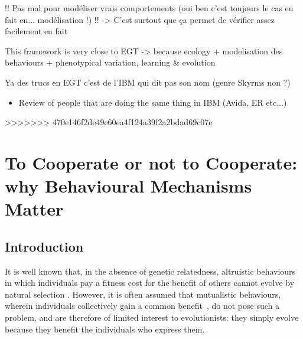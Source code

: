     !! Pas mal pour modéliser vrais comportements (oui ben c'est toujours le cas en fait en... modélisation !) !!
        -> C'est surtout que ça permet de vérifier assez facilement en fait

    This framework is very close to EGT -> because ecology + modelisation des behaviours
            + phenotypical variation, learning & evolution

    Ya des trucs en EGT c'est de l'IBM qui dit pas son nom (genre Skyrms non ?)




    \begin{itemize}
      \item{Review of people that are doing the same thing in IBM (Avida, ER etc...)}
    \end{itemize}






































>>>>>>> 470e146f2de49e60ea4f124a39f2a2bdad69c07e
\section{To Cooperate or not to Cooperate: why Behavioural Mechanisms Matter}
  \subsection{Introduction}
    It is well known that, in the absence of genetic relatedness, altruistic behaviours in which individuals pay a fitness cost for the benefit of others cannot evolve by natural selection \cite{Hamilton1964,West2007a}. However, it is often assumed that mutualistic behaviours, wherein individuals collectively gain a common benefit~\cite{Leimar2003, Leimar2010}, do not pose such a problem, and are therefore of limited interest to evolutionists: they simply evolve because they benefit the individuals who express them.

